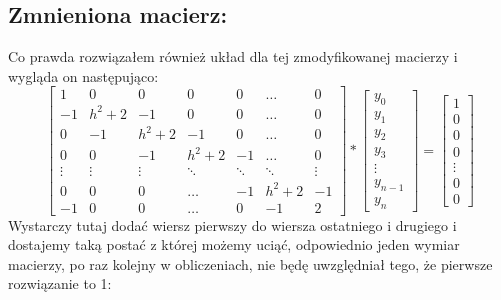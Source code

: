 \documentclass[12pt]{article}
\begin{document}
\subsection{Zmnieniona macierz:}
Co prawda rozwiązałem również układ dla tej zmodyfikowanej macierzy i wygląda on następująco:
\[
\begin{bmatrix}
    1 & 0 & 0 & 0 & 0 & \dots & 0\\
    -1 & h^{2}+2 & -1 & 0 & 0 & \dots & 0\\ 
    0 & -1 & h^{2}+2 & -1 & 0 & \dots & 0\\
    0 & 0 & -1 & h^{2}+2 & -1 &\dots & 0\\
    \vdots & \vdots & \vdots & \ddots & \ddots & \ddots & \vdots\\
    0 & 0 & 0 & \hdots & -1 & h^{2}+2 & -1\\
    -1 & 0 & 0 & \hdots & 0 & -1 & 2
\end{bmatrix}
*
\begin{bmatrix}
    y_{0}\\
    y_{1}\\
    y_{2}\\
    y_{3}\\
    \vdots\\
    y_{n-1}\\
    y_{n}
\end{bmatrix}
=
\begin{bmatrix}
    1\\
    0\\
    0\\
    0\\
    \vdots\\
    0\\
    0
\end{bmatrix}
\]
Wystarczy tutaj dodać wiersz pierwszy do wiersza ostatniego i drugiego i dostajemy taką postać z której możemy uciąć, odpowiednio jeden wymiar macierzy, po raz kolejny w obliczeniach, nie będę uwzględniał tego, że pierwsze rozwiązanie to 1: 
\end{document}

